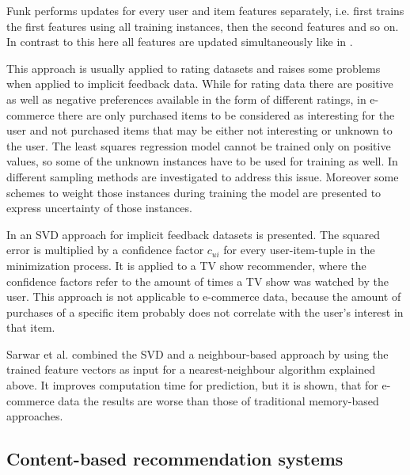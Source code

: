 \documentclass[10pt]{reportMaster}
\begin{document}
Funk performs updates for every user and item features separately, i.e. first trains the first features using all training instances, then the second features and so on.
In contrast to this here all features are updated simultaneously like in \cite{matrixFactorizationDifRegParam}.

This approach is usually applied to rating datasets and raises some problems when applied to implicit feedback data.
While for rating data there are positive as well as negative preferences available in the form of different ratings, in e-commerce there are only purchased items to be considered as interesting for the user and not purchased items that may be either not interesting or unknown to the user.
The least squares regression model cannot be trained only on positive values, so some of the unknown instances have to be used for training as well.
In \cite{occf} different sampling methods are investigated to address this issue.
Moreover some schemes to weight those instances during training the model are presented to express uncertainty of those instances.

In \cite{CFForImplFeedback} an SVD approach for implicit feedback datasets is presented.
The squared error is multiplied by a confidence factor $c_{ui}$ for every user-item-tuple in the minimization process.
It is applied to a TV show recommender, where the confidence factors refer to the amount of times a TV show was watched by the user.
This approach is not applicable to e-commerce data, because the amount of purchases of a specific item probably does not correlate with the user's interest in that item.

Sarwar et al. \cite{nnOnSvd} combined the SVD and a neighbour-based approach by using the trained feature vectors as input for a nearest-neighbour algorithm explained above.
It improves computation time for prediction, but it is shown, that for e-commerce data the results are worse than those of traditional memory-based approaches.



\subsection*{Content-based recommendation systems}
\label{rs_cb}
\end{document}
